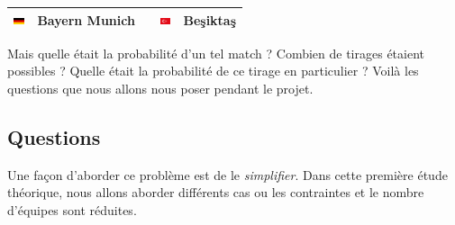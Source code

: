 \documentclass{../ficheTDTP}
\begin{document}
\begin{tabular}{|clccl|}
\includegraphics[height=0.2cm]{flags/de.png} & Bayern Munich & & \includegraphics[height=0.2cm]{flags/tr.png} & Beşiktaş \\ \hline
\end{tabular}

\vspace{0.5cm}

Mais quelle était la probabilité d'un tel match ? Combien de tirages étaient possibles ? Quelle était la probabilité de ce tirage en particulier ? Voilà les questions que nous allons nous poser pendant le projet.

\subsection{Questions}

Une façon d'aborder ce problème est de le \textit{simplifier}. Dans cette première étude théorique, nous allons aborder différents cas ou les contraintes et le nombre d'équipes sont réduites.
\end{document}
